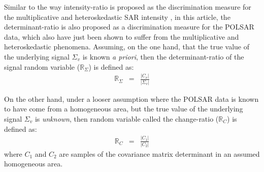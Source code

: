 \documentclass[journal]{IEEEtran}
\begin{document}
Similar to the way intensity-ratio is proposed as the discrimination measure for the multiplicative and heteroskedastic SAR intensity \cite{Rignot_1993_TGRS_896},
in this article, the determinant-ratio is also proposed as a discrimination measure for the POLSAR data,
  which also have just been shown to suffer from the multiplicative and heteroskedastic phenomena.
Assuming, on the one hand,
  that the true value of the underlying signal $\Sigma_v$ is known \textit{a priori},
then the determinant-ratio of the signal random variable ($\mathbb{R}_{\Sigma}$) %
  is defined as:
\begin{eqnarray}
  \mathbb{R}_{\Sigma} &=& \frac{|C_v|}{|\Sigma_v|} \label{eqn:determinant_ratio_observables}%
\end{eqnarray}

On the other hand, under a looser assumption %
  where the POLSAR data is known to have come from a homogeneous area, but the true value of the underlying signal $\Sigma_v$ is \textit{unknown},
 then random variable called the change-ratio ($\mathbb{R}_{C}$)  is defined as:
\begin{eqnarray}
  \mathbb{R}_{C} &=& \frac{|C_1|}{|C_2|} \label{eqn:determinant_ratio_samples_observables}%
\end{eqnarray}
where $C_1$ and $C_2$ are samples of the covariance matrix determinant in an assumed homogeneous area. 

\end{document}
